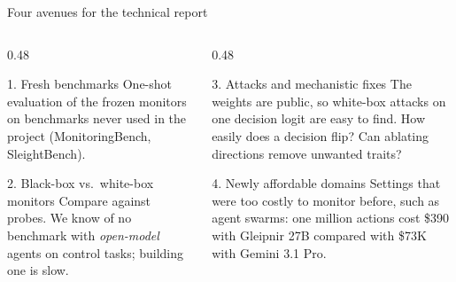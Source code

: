 \begin{frame}{Four avenues for the technical report}
    \begin{columns}[T,onlytextwidth]
        \begin{column}{0.48\textwidth}
            \begin{block}{1. Fresh benchmarks}
                \small One-shot evaluation of the frozen monitors on benchmarks never
                used in the project (MonitoringBench, SleightBench).
            \par{}
            \end{block}
            \begin{block}{2. Black-box vs.\ white-box monitors}
                \small Compare against probes. We know of no benchmark with
                \emph{open-model} agents on control tasks; building one is slow.
            \par{}
            \end{block}
        \end{column}
        \begin{column}{0.48\textwidth}
            \begin{block}{3. Attacks and mechanistic fixes}
                \small The weights are public, so white-box attacks on one
                decision logit are easy to find. How easily does a decision flip?
                Can ablating directions remove unwanted traits?
            \par{}
            \end{block}
            \begin{block}{4. Newly affordable domains}
                \small Settings that were too costly to monitor before, such as
                agent swarms: one million actions cost \$390 with Gleipnir 27B
                compared with \$73K with Gemini 3.1 Pro.
            \par{}
            \end{block}
        \end{column}
    \end{columns}
\end{frame}

